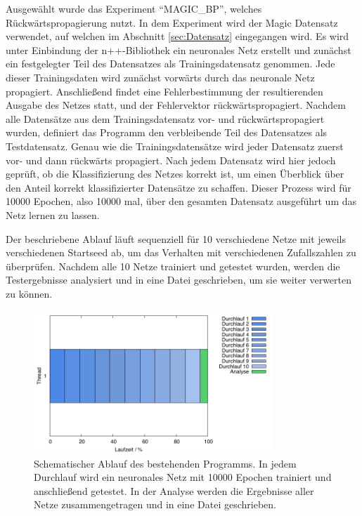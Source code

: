 Ausgewählt wurde das Experiment \enquote{MAGIC\_BP}, welches Rückwärtspropagierung nutzt. In dem Experiment wird der Magic Datensatz verwendet, auf welchen im Abschnitt \ref{sec:Datensatz} eingegangen wird. Es wird unter Einbindung der n++-Bibliothek ein neuronales Netz erstellt und zunächst ein festgelegter Teil des Datensatzes als Trainingsdatensatz genommen. Jede dieser Trainingsdaten wird zunächst vorwärts durch das neuronale Netz propagiert. Anschließend findet eine Fehlerbestimmung der resultierenden Ausgabe des Netzes statt, und der Fehlervektor rückwärtspropagiert.
Nachdem alle Datensätze aus dem Trainingsdatensatz vor- und rückwärtspropagiert wurden, definiert das Programm den verbleibende Teil des Datensatzes als Testdatensatz. Genau wie die Trainingsdatensätze wird jeder Datensatz zuerst vor- und dann rückwärts propagiert. Nach jedem Datensatz wird hier jedoch geprüft, ob die Klassifizierung des Netzes korrekt ist, um einen Überblick über den Anteil korrekt klassifizierter Datensätze zu schaffen.
Dieser Prozess wird für 10000 Epochen, also 10000 mal, über den gesamten Datensatz ausgeführt um das Netz lernen zu lassen.

Der beschriebene Ablauf läuft sequenziell für 10 verschiedene Netze mit jeweils verschiedenen Startseed ab, um das Verhalten mit verschiedenen Zufallszahlen zu überprüfen. Nachdem alle 10 Netze trainiert und getestet wurden, werden die Testergebnisse analysiert und in eine Datei geschrieben, um sie weiter verwerten zu können.

\begin{figure}[H]
\centering
\includegraphics[width=0.8\textwidth]{../results/plots/timeline/timeline_plot_1thread.pdf}
\caption{Schematischer Ablauf des bestehenden Programms. In jedem Durchlauf wird ein neuronales Netz mit 10000 Epochen trainiert und anschließend getestet. In der Analyse werden die Ergebnisse aller Netze zusammengetragen und in eine Datei geschrieben.}
\label{fig:timeline_existing_code}
\end{figure}

